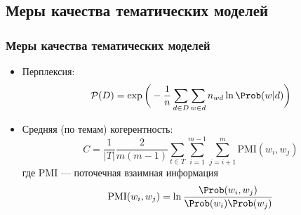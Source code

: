 \documentclass[unicode]{beamer}
\begin{document}
\subsection{Меры качества тематических моделей}
\begin{frame}
\frametitle{Меры качества тематических моделей}
\begin{itemize}
    \item Перплексия:
    $$\mathcal{P}(D) = \exp \bigg( -\frac{1}{n} \sum_{d \in D} \sum_{w \in d} n_{wd} \ln \Prob(w|d) \bigg)$$
    \item Средняя (по темам) когерентность:
    $$ C = \frac{1}{|T|} \frac{2}{m(m-1)} \sum_{t \in T} \sum_{i=1}^{m-1} \sum_{j=i+1}^m \text{PMI} (w_i, w_j)$$
    где PMI --- поточечная взаимная информация
    $$ \text{PMI} (w_i, w_j) = \ln \frac{\Prob(w_i, w_j)}{\Prob(w_i) \Prob(w_j)}$$
\end{itemize}
\end{frame}
\end{document}
